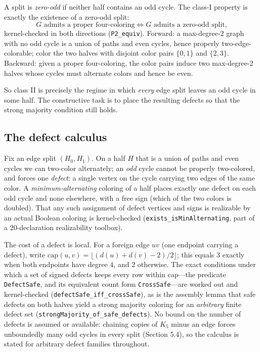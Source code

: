 \documentclass[11pt]{article}
\theoremstyle{definition}
\theoremstyle{remark}
\begin{document}
A split is \emph{zero-odd} if neither half contains an odd cycle. The class-I property is exactly the existence of a zero-odd split:
\[
G \text{ admits a proper four-coloring} \iff G \text{ admits a zero-odd split,}
\]
kernel-checked in both directions (\texttt{P2\_equiv}). Forward: a max-degree-2 graph with no odd cycle is a union of paths and even cycles, hence properly two-edge-colorable; color the two halves with disjoint color pairs $\{0,1\}$ and $\{2,3\}$. Backward: given a proper four-coloring, the color pairs induce two max-degree-2 halves whose cycles must alternate colors and hence be even.

So class II is precisely the regime in which \emph{every} edge split leaves an odd cycle in some half. The constructive task is to place the resulting defects so that the strong majority condition still holds.

\subsection{The defect calculus}\label{23-defect-calculus}

Fix an edge split $(H_0, H_1)$. On a half $H$ that is a union of paths and even cycles we can two-color alternately; an \emph{odd} cycle cannot be properly two-colored, and forces one \emph{defect}: a single vertex on the cycle carrying two edges of the same color. A \emph{minimum-alternating} coloring of a half places exactly one defect on each odd cycle and none elsewhere, with a free sign (which of the two colors is doubled). That any such assignment of defect vertices and signs is realizable by an actual Boolean coloring is kernel-checked (\texttt{exists\_isMinAlternating}, part of a 20-declaration realizability toolbox).

The cost of a defect is local. For a foreign edge $uv$ (one endpoint carrying a defect), write $\mathrm{cap}(u,v) = \lfloor (d(u)+d(v)-2)/2 \rfloor$; this equals $3$ exactly when both endpoints have degree $4$, and $2$ otherwise. The exact conditions under which a set of signed defects keeps every row within cap---the predicate \texttt{DefectSafe}, and its equivalent count form \texttt{CrossSafe}---are worked out and kernel-checked (\texttt{defectSafe\_iff\_crossSafe}), as is the assembly lemma that safe defects on both halves yield a strong majority coloring for an \emph{arbitrary} finite defect set (\texttt{strongMajority\_of\_safe\_defects}). No bound on the number of defects is assumed or available: chaining copies of $K_5$ minus an edge forces unboundedly many odd cycles in every split (Section 5.4), so the calculus is stated for arbitrary defect families throughout.
\end{document}
